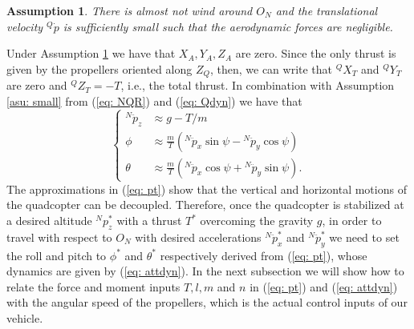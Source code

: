 \documentclass[a4paper, onecolumn]{ieeeconf}
\newtheorem{assumption}[theorem]{\textbf{Assumption}}
\begin{document}
\begin{assumption}
	\label{asu: vel}
There is almost not wind around $O_N$ and the translational velocity ${^Q\dot p}$ is sufficiently small such that the aerodynamic forces are negligible.
\end{assumption}
Under Assumption \ref{asu: vel} we have that $X_A, Y_A, Z_A$ are zero. Since the only thrust is given by the propellers oriented along $Z_Q$, then, we can write that $^QX_T$ and $^QY_T$ are zero and $^QZ_T = -T$, i.e., the total thrust. In combination with Assumption \ref{asu: small} from (\ref{eq: NQR}) and (\ref{eq: Qdyn}) we have that
\begin{equation}
	\begin{cases}
	^N\ddot p_z&\approx g - T/m \\
	\phi &\approx \frac{m}{T}\left({^N\ddot p_x}\sin{\psi} - {^N\ddot p_y}\cos{\psi}\right) \\
	\theta &\approx \frac{m}{T}\left({^N\ddot p_x}\cos{\psi} + {^N\ddot p_y}\sin{\psi}\right).
\end{cases}
\label{eq: pt}
\end{equation}
The approximations in (\ref{eq: pt}) show that the vertical and horizontal motions of the quadcopter can be decoupled. Therefore, once the quadcopter is stabilized at a desired altitude $^Np_z^*$ with a thrust $T^*$ overcoming the gravity $g$, in order to travel with respect to $O_N$ with desired accelerations $^N\ddot p_x^*$ and $^N\ddot p_y^*$ we need to set the roll and pitch to $\phi^*$ and $\theta^*$ respectively derived from (\ref{eq: pt}), whose dynamics are given by (\ref{eq: attdyn}). In the next subsection we will show how to relate the force and moment inputs $T, l, m$ and $n$ in (\ref{eq: pt}) and (\ref{eq: attdyn}) with the angular speed of the propellers, which is the actual control inputs of our vehicle.
\end{document}
